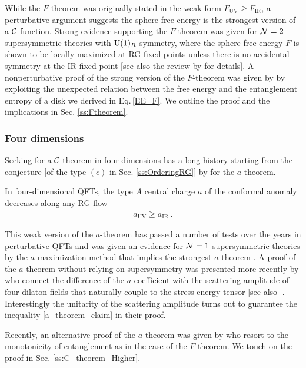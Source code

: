 While the $F$-theorem was originally stated in the weak form $F_\mathrm{UV} \ge F_\mathrm{IR}$, a perturbative argument \cite{Klebanov:2011gs,Yonekura:2012kb} suggests the sphere free energy is the strongest version of a ${\cal C}$-function.
Strong evidence supporting the $F$-theorem was given for ${\cal N}=2$ supersymmetric theories with $\mathrm{U}(1)_R$ symmetry, where
the sphere free energy $F$ is shown to be locally maximized at RG fixed points \cite{Jafferis:2010un,Closset:2012vg} unless there is no accidental symmetry at the IR fixed point [see also the review by \textcite{Pufu:2016zxm} for details].
A nonperturbative proof of the strong version of the $F$-theorem was given by \textcite{Casini:2012ei} by exploiting the unexpected relation between the free energy and  the entanglement entropy of a disk we derived in Eq.\,\eqref{EE_F}. 
We outline the proof and the implications in Sec. \ref{ss:Ftheorem}.


\subsubsection{Four dimensions}
Seeking for a ${\cal C}$-theorem in four dimensions has a long history starting from the conjecture [of the type $(c)$ in Sec. \ref{ss:OrderingRG}] by \textcite{Cardy:1988cwa} for the $a$-theorem.
\begin{theorem*}[$a$-theorem]
In four-dimensional QFTs, the type $A$ central charge $a$ of the conformal anomaly decreases along any RG flow
\begin{align}\label{a_theorem_claim}
a_\mathrm{UV} \ge a_\mathrm{IR} \ .
\end{align}
\end{theorem*}
This weak version of the $a$-theorem has passed a number of tests over the years in perturbative QFTs \cite{Osborn:1989td,Jack:1990eb} and was given an evidence for ${\cal N}=1$ supersymmetric theories by the $a$-maximization method that implies the strongest $a$-theorem \cite{Intriligator:2003jj,Barnes:2004jj}.
A proof of the $a$-theorem without relying on supersymmetry was presented more recently by \textcite{Komargodski:2011vj} who connect the difference of the $a$-coefficient with the scattering amplitude of four dilaton fields that naturally couple to the stress-energy tensor [see also \cite{Komargodski:2011xv}].
Interestingly the unitarity of the scattering amplitude turns out to guarantee the inequality \eqref{a_theorem_claim} in their proof.

Recently, an alternative proof of the $a$-theorem was given by \textcite{Casini:2017vbe} who resort to the monotonicity of entanglement as in the case of the $F$-theorem.
We touch on the proof in Sec. \ref{ss:C_theorem_Higher}.

